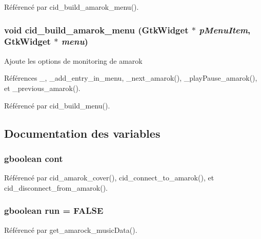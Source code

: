 Référencé par cid\_\-build\_\-amarok\_\-menu().
\subsubsection{\setlength{\rightskip}{0pt plus 5cm}void cid\_\-build\_\-amarok\_\-menu (GtkWidget $\ast$ {\em pMenuItem}, \/  GtkWidget $\ast$ {\em menu})}\label{cid-amarok_8c_b0c12baf7e61e7e99cca31549b7e1838}


Ajoute les options de monitoring de amarok 

Références \_\-, \_\-add\_\-entry\_\-in\_\-menu, \_\-next\_\-amarok(), \_\-playPause\_\-amarok(), et \_\-previous\_\-amarok().

Référencé par cid\_\-build\_\-menu().

\subsection{Documentation des variables}
\subsubsection{\setlength{\rightskip}{0pt plus 5cm}gboolean {\bf cont}}\label{cid-amarok_8c_87bf97b2459e460bc935239c9a1e9564}




Référencé par cid\_\-amarok\_\-cover(), cid\_\-connect\_\-to\_\-amarok(), et cid\_\-disconnect\_\-from\_\-amarok().
\subsubsection{\setlength{\rightskip}{0pt plus 5cm}gboolean {\bf run} = FALSE}\label{cid-amarok_8c_1f67efb1989805aac8cf2967e4859a10}




Référencé par get\_\-amarock\_\-musicData().